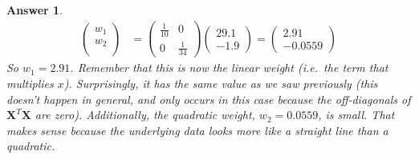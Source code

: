 \documentclass{article}
\newtheorem{answer}{Answer}
\newcommand{\X}{\mathbf{X}}
\begin{document}
\begin{answer}
\begin{align}
    \begin{pmatrix}
      w_1\\
      w_2\\
    \end{pmatrix} &= 
    \begin{pmatrix} \tfrac{1}{10} & 0 \\ 0 & \tfrac{1}{34} \end{pmatrix}
    \begin{pmatrix}
      29.1\\
      -1.9
    \end{pmatrix}
    = 
    \begin{pmatrix}
      2.91\\
      -0.0559
    \end{pmatrix}
  \end{align}
  So $w_1 = 2.91$.  Remember that this is now the linear weight (i.e.\ the term that multiplies $x$). Surprisingly, it has the same value as we saw previously (this doesn't happen in general, and only occurs in this case because the off-diagonals of $\X^T \X$ are zero). Additionally, the quadratic weight, $w_2 = 0.0559$, is small.  That makes sense because the underlying data looks more like a straight line than a quadratic.
\end{answer}
\end{document}
